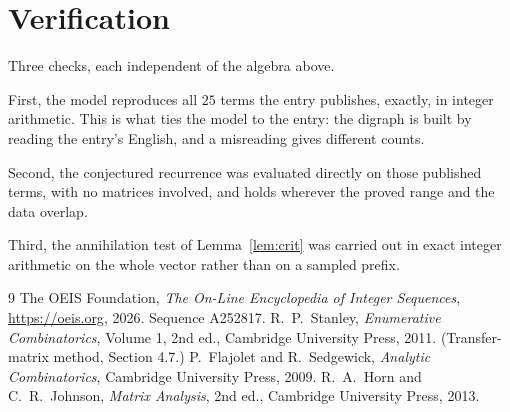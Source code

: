 \documentclass[11pt,a4paper]{article}
\theoremstyle{plain}
\theoremstyle{definition}
\begin{document}
\section{Verification}

Three checks, each independent of the algebra above.

First, the model reproduces all $25$ terms the entry publishes, exactly, in integer
arithmetic. This is what ties the model to the entry: the digraph is built by reading the
entry's English, and a misreading gives different counts.

Second, the conjectured recurrence was evaluated directly on those published terms, with no
matrices involved, and holds wherever the proved range and the data overlap.

Third, the annihilation test of Lemma~\ref{lem:crit} was carried out in exact integer
arithmetic on the whole vector rather than on a sampled prefix.

\begin{thebibliography}{9}
 The OEIS Foundation, \emph{The On-Line Encyclopedia of Integer
Sequences}, \url{https://oeis.org}, 2026. Sequence A252817.
 R.~P.~Stanley, \emph{Enumerative Combinatorics}, Volume 1, 2nd ed.,
Cambridge University Press, 2011. (Transfer-matrix method, Section 4.7.)
 P.~Flajolet and R.~Sedgewick, \emph{Analytic Combinatorics}, Cambridge
University Press, 2009.
 R.~A.~Horn and C.~R.~Johnson, \emph{Matrix Analysis}, 2nd ed., Cambridge
University Press, 2013.
\end{thebibliography}
\end{document}
